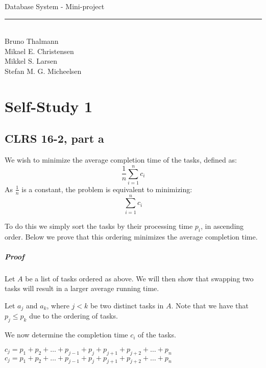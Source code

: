 
\newcommand{\HRule}{\rule{\linewidth}{0.5mm}}


\begin{titlepage}
\centering
{\LARGE Database System - Mini-project}
\HRule \\[0.5cm]
Bruno Thalmann\\
			Mikael E. Christensen\\
			Mikkel S. Larsen\\
			Stefan M. G. Micheelsen
\end{titlepage}

\chapter*{Self-Study 1}

\section*{CLRS 16-2, part a}
We wish to minimize the average completion time of the tasks, defined as:
$$\frac{1}{n}\sum_{i=1}^{n}c_i$$
As $\frac{1}{n}$ is a constant, the problem is equivalent to minimizing:
$$\sum_{i=1}^{n}c_i$$

To do this we simply sort the tasks by their processing time $p_i$, in ascending order.
Below we prove that this ordering minimizes the average completion time.

\paragraph{Proof}
Let $A$ be a list of tasks ordered as above.
We will then show that swapping two tasks will result in a larger average running time.

Let $a_j$ and $a_k$, where $j < k$ be two distinct tasks in $A$.
Note that we have that $p_j \leq p_k$ due to the ordering of tasks.

We now determine the completion time $c_i$ of the tasks.


$c_j=p_1+p_2+\dots+p_{j-1}+p_j + p_{j+1} + p_{j+2} + \dots + p_n$\\
$c_{j}=p_1+p_2+\dots+p_{j-1}+p_j + p_{j+1} + p_{j+2} + \dots + p_n$\\

